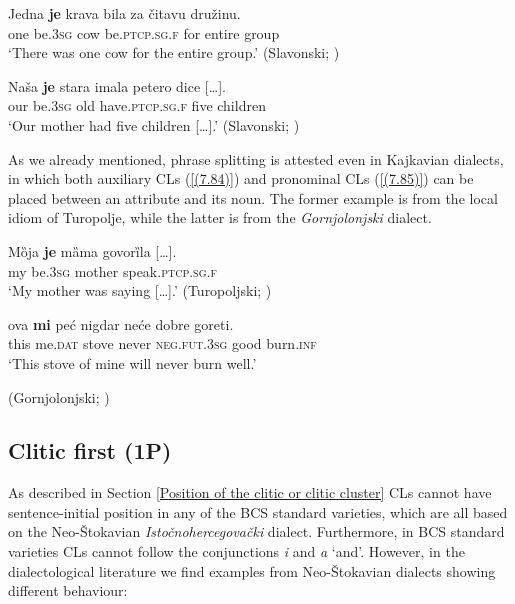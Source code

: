 \begin{exe}\ex\label{(7.82)}
\gll Jedna  \textbf{je}  krava  bila  za  čitavu  družinu.  \\
one be.3\textsc{sg}  cow be.\textsc{ptcp.sg.f} for entire group \\
\glt ‘There was one cow for the entire group.’
\hfill  (Slavonski; \citealt[111]{Gorjanac11})

\ex\label{(7.83)}
\gll Naša  \textbf{je}  stara  imala  petero  {dice {[\dots].}} \\
our be.3\textsc{sg} old  have.\textsc{ptcp.sg.f} five children \\
\glt ‘Our mother had five children [\dots].’
\hfill  (Slavonski; \citealt[112]{Gorjanac11})
\end{exe}

\noindent As we already mentioned, phrase splitting is attested even in Kajkavian dialects, in which both auxiliary CLs (\ref{(7.84)}) and pronominal CLs (\ref{(7.85)}) can be placed between an attribute and its noun. The former example is from the local idiom of Turopolje, while the latter is from the \textit{Gornjolonjski} dialect.

\begin{exe}\ex\label{(7.84)}
\gll Mȍja  \textbf{je}  mȁma  {govorȉla [\dots].} \\
my be.3\textsc{sg} mother speak.\textsc{ptcp.sg.f} \\
\glt ‘My mother was saying [\dots].’
\hfill  (Turopoljski; \citealt[139]{Loncaric94})

\ex\label{(7.85)}
\gll ova  \textbf{mi}  peć  nigdar  neće  dobre  goreti.  \\
this me.\textsc{dat}  stove never \textsc{neg.fut.3sg} good burn.\textsc{inf}  \\
\glt ‘This stove of mine will never burn well.’ \\
\strut\hfill  (Gornjolonjski; \citealt[242]{BrlobasLoncaric12})
\end{exe}


\subsection{Clitic first (1P)}
\label{Clitic first}
As described in Section \ref{Position of the clitic or clitic cluster} CLs cannot have sentence-initial position in any of the BCS standard varieties, which are all based on the Neo-Štokavian \textit{Istočnohercegovački} dialect. Furthermore, in BCS standard varieties CLs cannot follow the conjunctions \textit{i} and \textit{a} ‘and’. However, in the dialectological literature we find examples from Neo-Štokavian dialects showing different behaviour:


